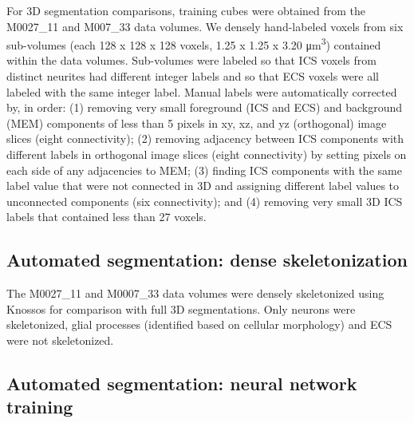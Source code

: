 \documentclass{article}
\begin{document}
For 3D segmentation comparisons, training cubes were obtained from the M0027\_11 and M007\_33 data volumes. We densely hand-labeled voxels from six sub-volumes (each 128 x 128 x 128 voxels, 1.25 x 1.25 x 3.20 μm\textsuperscript{3}) contained within the data volumes. Sub-volumes were labeled so that ICS voxels from distinct neurites had different integer labels and so that ECS voxels were all labeled with the same integer label. Manual labels were automatically corrected by, in order: (1) removing very small foreground (ICS and ECS) and background (MEM) components of less than 5 pixels in xy, xz, and yz (orthogonal) image slices (eight connectivity); (2) removing adjacency between ICS components with different labels in orthogonal image slices (eight connectivity) by setting pixels on each side of any adjacencies to MEM; (3) finding ICS components with the same label value that were not connected in 3D and assigning different label values to unconnected components (six connectivity); and (4) removing very small 3D ICS labels that contained less than 27 voxels.

\subsection*{Automated segmentation: dense skeletonization}

The M0027\_11 and M0007\_33 data volumes were densely skeletonized using Knossos for comparison with full 3D segmentations. Only neurons were skeletonized, glial processes (identified based on cellular morphology) and ECS were not skeletonized.

\subsection*{Automated segmentation: neural network training}
\end{document}
